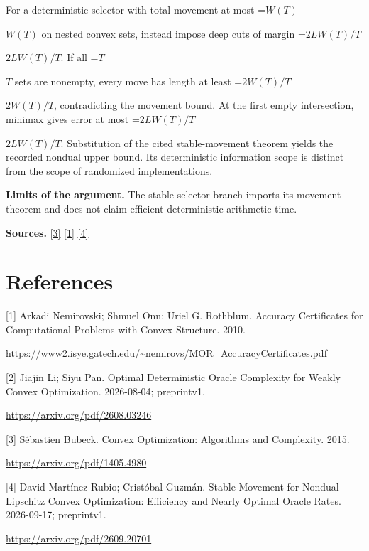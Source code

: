 \documentclass[10pt,a4paper]{article}
\newcommand{\AtlasMath}[1]{\par\begingroup\centering\setbox0=\hbox{$\displaystyle #1$}\ifdim\wd0>1.4\linewidth\typeout{ATLAS WIDE FORMULA: \the\wd0}\fi\ifdim\wd0>\linewidth\resizebox{\linewidth}{!}{\box0}\else\box0\fi\par\endgroup}
\newcommand{\AtlasInlineMath}[1]{\begingroup\setbox0=\hbox{$#1$}\ifdim\wd0>.4\linewidth\endgroup\AtlasMath{#1}\else\endgroup$#1$\fi}
\begin{document}
For a deterministic selector with total movement at most \AtlasInlineMath{W(T)} on nested convex sets, instead impose deep cuts of margin \AtlasInlineMath{2LW(T)/T}. If all \AtlasInlineMath{T} sets are nonempty, every move has length at least \AtlasInlineMath{2W(T)/T}, contradicting the movement bound. At the first empty intersection, minimax gives error at most \AtlasInlineMath{2LW(T)/T}. Substitution of the cited stable-movement theorem yields the recorded nondual upper bound. Its deterministic information scope is distinct from the scope of randomized implementations.

\textbf{Limits of the argument.} The stable-selector branch imports its movement theorem and does not claim efficient deterministic arithmetic time.

\textbf{Sources.} \href{https://arxiv.org/pdf/1405.4980}{[3]} \href{https://www2.isye.gatech.edu/~nemirovs/MOR_AccuracyCertificates.pdf}{[1]} \href{https://arxiv.org/pdf/2609.20701}{[4]}

\section{References}
[1] Arkadi Nemirovski; Shmuel Onn; Uriel G. Rothblum. Accuracy Certificates for Computational Problems with Convex Structure. 2010.

\url{https://www2.isye.gatech.edu/~nemirovs/MOR_AccuracyCertificates.pdf}

[2] Jiajin Li; Siyu Pan. Optimal Deterministic Oracle Complexity for Weakly Convex Optimization. 2026-08-04; preprintv1.

\url{https://arxiv.org/pdf/2608.03246}

[3] Sébastien Bubeck. Convex Optimization: Algorithms and Complexity. 2015.

\url{https://arxiv.org/pdf/1405.4980}

[4] David Martínez-Rubio; Cristóbal Guzmán. Stable Movement for Nondual Lipschitz Convex Optimization: Efficiency and Nearly Optimal Oracle Rates. 2026-09-17; preprintv1.

\url{https://arxiv.org/pdf/2609.20701}
\end{document}
